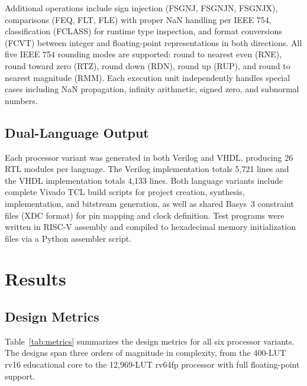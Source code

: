 \documentclass[conference]{IEEEtran}
\begin{document}
Additional operations include sign injection (FSGNJ, FSGNJN, FSGNJX), comparisons (FEQ, FLT, FLE) with proper NaN handling per IEEE 754, classification (FCLASS) for runtime type inspection, and format conversions (FCVT) between integer and floating-point representations in both directions. All five IEEE 754 rounding modes are supported: round to nearest even (RNE), round toward zero (RTZ), round down (RDN), round up (RUP), and round to nearest magnitude (RMM). Each execution unit independently handles special cases including NaN propagation, infinity arithmetic, signed zero, and subnormal numbers.

\subsection{Dual-Language Output}

Each processor variant was generated in both Verilog and VHDL, producing 26 RTL modules per language. The Verilog implementation totals 5,721 lines and the VHDL implementation totals 4,133 lines. Both language variants include complete Vivado TCL build scripts for project creation, synthesis, implementation, and bitstream generation, as well as shared Basys~3 constraint files (XDC format) for pin mapping and clock definition. Test programs were written in RISC-V assembly and compiled to hexadecimal memory initialization files via a Python assembler script.

\section{Results}

\subsection{Design Metrics}

Table~\ref{tab:metrics} summarizes the design metrics for all six processor variants. The designs span three orders of magnitude in complexity, from the 400-LUT rv16 educational core to the 12,969-LUT rv64fp processor with full floating-point support.
\end{document}
